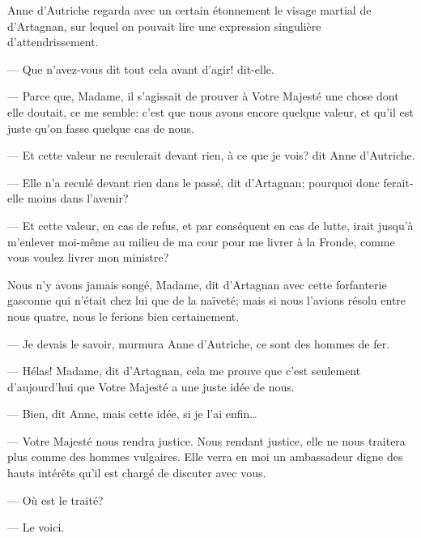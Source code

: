 Anne d'Autriche regarda avec un certain étonnement le visage martial de d'Artagnan, sur lequel on pouvait lire une expression singulière d'attendrissement.

— Que n'avez-vous dit tout cela avant d'agir! dit-elle.

— Parce que, Madame, il s'agissait de prouver à Votre Majesté une chose dont elle doutait, ce me semble: c'est que nous avons encore quelque valeur, et qu'il est juste qu'on fasse quelque cas de nous.

— Et cette valeur ne reculerait devant rien, à ce que je vois? dit Anne d'Autriche.

— Elle n'a reculé devant rien dans le passé, dit d'Artagnan; pourquoi donc ferait-elle moins dans l'avenir?

— Et cette valeur, en cas de refus, et par conséquent en cas de lutte, irait jusqu'à m'enlever moi-même au milieu de ma cour pour me livrer à la Fronde, comme vous voulez livrer mon ministre?

Nous n'y avons jamais songé, Madame, dit d'Artagnan avec cette forfanterie gasconne qui n'était chez lui que de la naïveté; mais si nous l'avions résolu entre nous quatre, nous le ferions bien certainement.

— Je devais le savoir, murmura Anne d'Autriche, ce sont des hommes de fer.

— Hélas! Madame, dit d'Artagnan, cela me prouve que c'est seulement d'aujourd'hui que Votre Majesté a une juste idée de nous.

— Bien, dit Anne, mais cette idée, si je l'ai enfin\dots

— Votre Majesté nous rendra justice. Nous rendant justice, elle ne nous traitera plus comme des hommes vulgaires. Elle verra en moi un ambassadeur digne des hauts intérêts qu'il est chargé de discuter avec vous.

— Où est le traité?

— Le voici.
